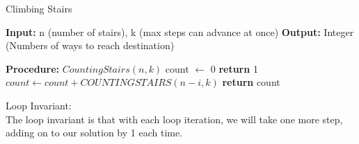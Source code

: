 \documentclass[10pt,letterpaper]{article}
\begin{document}
\begin{algorithm}
\caption{Climbing Stairs}\label{euclid}
\begin{algorithmic}[1]
\State \textbf{Input:} n (number of stairs), k (max steps can advance at once)
\State \textbf{Output:} Integer (Numbers of ways to reach destination)

\State \textbf{Procedure:} $CountingStairs(n, k)$
\State count $\leftarrow$ 0
	\State \textbf{return} 1
\EndIf
{} 
	\State $count \leftarrow count + COUNTINGSTAIRS(n-i, k)$
\EndFor
\State \textbf{return} count


\end{algorithmic}
\end{algorithm}

\noindent Loop Invariant:\\
The loop invariant is that with each loop iteration, we will take one more step, adding on to our solution by 1 each time. 
\end{document}
